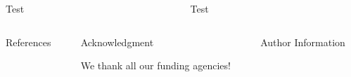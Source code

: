 \documentclass[t]{beamer}
\begin{document}
\begin{columns}[onlytextwidth]%
  \begin{column}{0.5\textwidth}%
    \begin{block}{Test}%
      \blindtext%
    \end{block}%
  \end{column}%
  \begin{column}{0.5\textwidth}%
    \begin{block}{Test}%
      \blindtext%
    \end{block}%
  \end{column}%
\end{columns}%


\vfill
\begin{columns}[t, onlytextwidth]%
  \begin{column}{0.42\textwidth}%
    \begin{block}[equal height group=bottom]{\normalsize References}
      \footnotesize%
      \printbibliography%
    \end{block}
  \end{column}%
  \begin{column}{0.42\textwidth}%
    \begin{block}[equal height group=bottom]{\normalsize Acknowledgment}
      \begin{multicols}{2}%
        \footnotesize
        We thank all our funding agencies!
      \end{multicols}%
    \end{block}
  \end{column}%
  \begin{column}{0.16\textwidth}%
    \footnotesize
    \begin{block}[equal height group=bottom]{\normalsize Author Information}
    \end{block}
  \end{column}%
\end{columns}%
\end{document}
